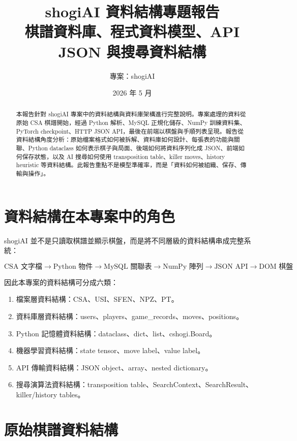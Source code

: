 \documentclass[12pt,a4paper,fontset=none]{ctexart}
\title{\textbf{shogiAI 資料結構專題報告}\\
\large 棋譜資料庫、程式資料模型、API JSON 與搜尋資料結構}
\author{專案：shogiAI}
\date{2026 年 5 月}
\begin{document}
\maketitle

\begin{abstract}
本報告針對 shogiAI 專案中的資料結構與資料庫架構進行完整說明。專案處理的資料從原始 CSA 棋譜開始，經過 Python 解析、MySQL 正規化儲存、NumPy 訓練資料集、PyTorch checkpoint、HTTP JSON API，最後在前端以棋盤與手順列表呈現。報告從資料結構角度分析：原始檔案格式如何被拆解、資料庫如何設計、每張表的功能與關聯、Python dataclass 如何表示棋子與局面、後端如何將資料序列化成 JSON、前端如何保存狀態，以及 AI 搜尋如何使用 transposition table、killer moves、history heuristic 等資料結構。此報告重點不是模型準確率，而是「資料如何被組織、保存、傳輸與操作」。
\end{abstract}

\tableofcontents
\newpage

\section{資料結構在本專案中的角色}

shogiAI 並不是只讀取棋譜並顯示棋盤，而是將不同層級的資料結構串成完整系統：

\[
\text{CSA 文字檔}
\rightarrow
\text{Python 物件}
\rightarrow
\text{MySQL 關聯表}
\rightarrow
\text{NumPy 陣列}
\rightarrow
\text{JSON API}
\rightarrow
\text{DOM 棋盤}
\]

因此本專案的資料結構可分成六類：

\begin{enumerate}
  \item 檔案層資料結構：CSA、USI、SFEN、NPZ、PT。
  \item 資料庫層資料結構：users、players、game\_records、moves、positions。
  \item Python 記憶體資料結構：dataclass、dict、list、cshogi.Board。
  \item 機器學習資料結構：state tensor、move label、value label。
  \item API 傳輸資料結構：JSON object、array、nested dictionary。
  \item 搜尋演算法資料結構：transposition table、SearchContext、SearchResult、killer/history tables。
\end{enumerate}

\section{原始棋譜資料結構}
\end{document}
